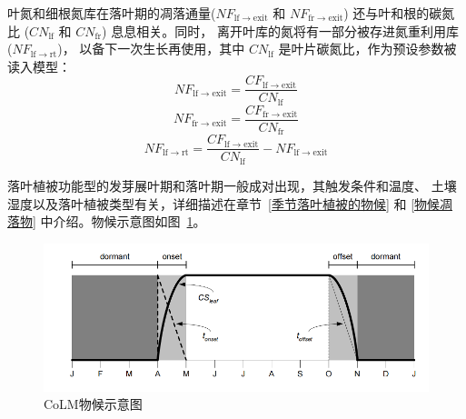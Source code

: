 \begin{enumerate}
    叶氮和细根氮库在落叶期的凋落通量($NF_{\mathrm{lf\rightarrow exit}}$ 和 $NF_{\mathrm{fr\rightarrow exit}}$)
    还与叶和根的碳氮比 ($CN_{\mathrm{lf}}$ 和 $CN_{\mathrm{fr}}$) 息息相关。同时，
    离开叶库的氮将有一部分被存进氮重利用库 ($NF_{\mathrm{lf\rightarrow rt}}$)，
    以备下一次生长再使用，其中 $CN_{\mathrm{lf}}$ 是叶片碳氮比，作为预设参数被读入模型：
    \begin{equation}
      NF_{\mathrm{lf\rightarrow exit}} = \frac{CF_{\mathrm{lf\rightarrow exit}}}{CN_{\mathrm{lf}}}
    \end{equation}
    \begin{equation}
      NF_{\mathrm{fr\rightarrow exit}} = \frac{CF_{\mathrm{fr\rightarrow exit}}}{CN_{\mathrm{fr}}}
    \end{equation}
    \begin{equation}
      NF_{\mathrm{lf\rightarrow rt}} = \frac{CF_{\mathrm{lf\rightarrow exit}}}{CN_{\mathrm{lf}}}-NF_{\mathrm{lf\rightarrow exit}}
    \end{equation}

    落叶植被功能型的发芽展叶期和落叶期一般成对出现，其触发条件和温度、
    土壤湿度以及落叶植被类型有关，详细描述在章节~\ref{季节落叶植被的物候} 和 \ref{物候凋落物} 中介绍。物候示意图如图~\ref{fig:CoLM物候示意图}。
    {
      \begin{figure}[htbp]
        \centering
        \includegraphics{Figures/植被生物地球化学循环过程/CoLM物候示意图.png}
        \caption[CoLM物候示意图]{CoLM物候示意图~\citep{lawrence2018} }
        \label{fig:CoLM物候示意图}
      \end{figure}
    }


\end{enumerate}
